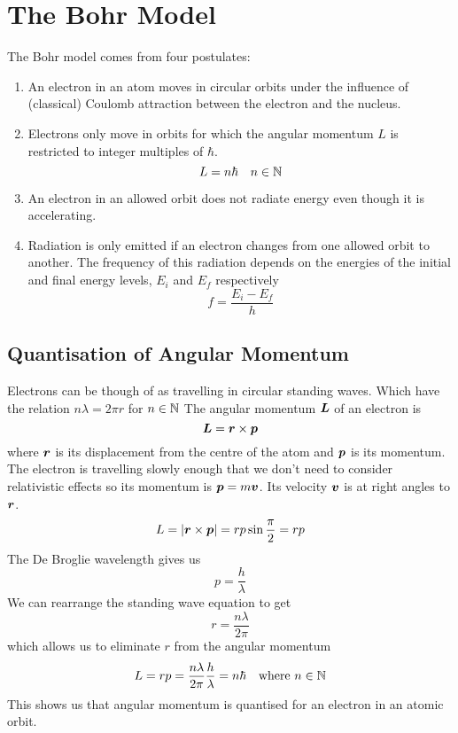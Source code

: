 \documentclass{article}
\begin{document}
    \section{The Bohr Model}
    The Bohr model comes from four postulates:
    \begin{enumerate}
        \item An electron in an atom moves in circular orbits under the influence of (classical) Coulomb attraction between the electron and the nucleus.
        \item Electrons only move in orbits for which the angular momentum \(L\) is restricted to integer multiples of \(\hbar\).
        \[L = n\hbar\quad n\in\mathbb{N}\]
        \item An electron in an allowed orbit does not radiate energy even though it is accelerating.
        \item Radiation is only emitted if an electron changes from one allowed orbit to another. 
        The frequency of this radiation depends on the energies of the initial and final energy levels, \(E_i\) and \(E_f\) respectively
        \begin{equation}\label{eqn:f=(E1-E2)/h}
            f = \frac{E_i - E_f}{h}
        \end{equation}
    \end{enumerate}
    
    \subsection{Quantisation of Angular Momentum}
    Electrons can be though of as travelling in circular standing waves.
    Which have the relation \(n\lambda = 2\pi r\) for \(n\in \mathbb{N}\)
    The angular momentum \(\bm{L}\) of an electron is
    \[\bm{L} = \bm{r} \times \bm{p}\]
    where \(\bm{r}\) is its displacement from the centre of the atom and \(\bm{p}\) is its momentum.
    The electron is travelling slowly enough that we don't need to consider relativistic effects so its momentum is \(\bm{p} = m\bm{v}\).
    Its velocity \(\bm{v}\) is at right angles to \(\bm{r}\).
    \[L =  |\bm{r}\times\bm{p}| = rp\sin\frac{\pi}{2} = rp\]
    The De Broglie wavelength gives us
    \[p = \frac{h}{\lambda}\]
    We can rearrange the standing wave equation to get
    \[r = \frac{n\lambda}{2\pi}\]
    which allows us to eliminate \(r\) from the angular momentum
    \[L = rp = \frac{n\lambda}{2\pi}\frac{h}{\lambda} = n\hbar\quad \text{where }n\in\mathbb{N}\]
    This shows us that angular momentum is quantised for an electron in an atomic orbit.
    
\end{document}
